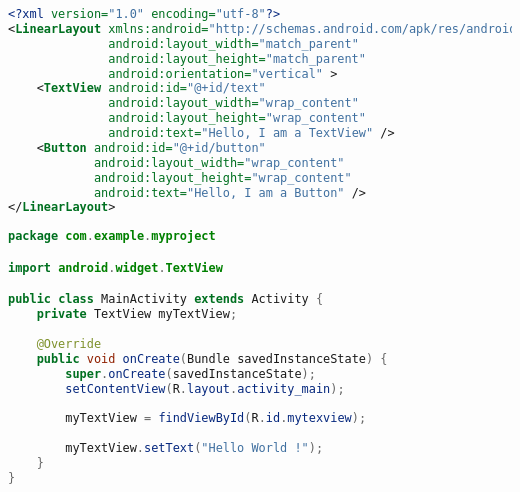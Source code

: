 \begin{lstlisting}[language=XML, caption=Esempio di Layout XML]
<?xml version="1.0" encoding="utf-8"?>
<LinearLayout xmlns:android="http://schemas.android.com/apk/res/android"
              android:layout_width="match_parent"
              android:layout_height="match_parent"
              android:orientation="vertical" >
    <TextView android:id="@+id/text"
              android:layout_width="wrap_content"
              android:layout_height="wrap_content"
              android:text="Hello, I am a TextView" />
    <Button android:id="@+id/button"
            android:layout_width="wrap_content"
            android:layout_height="wrap_content"
            android:text="Hello, I am a Button" />
</LinearLayout>
\end{lstlisting}

\begin{lstlisting}[language=Java, caption=Esempio di codice di un'Activity scritto in Java]
package com.example.myproject

import android.widget.TextView

public class MainActivity extends Activity {
    private TextView myTextView;
    
    @Override
    public void onCreate(Bundle savedInstanceState) {
        super.onCreate(savedInstanceState);
        setContentView(R.layout.activity_main);
        
        myTextView = findViewById(R.id.mytexview);
        
        myTextView.setText("Hello World !");
    }
}
\end{lstlisting}